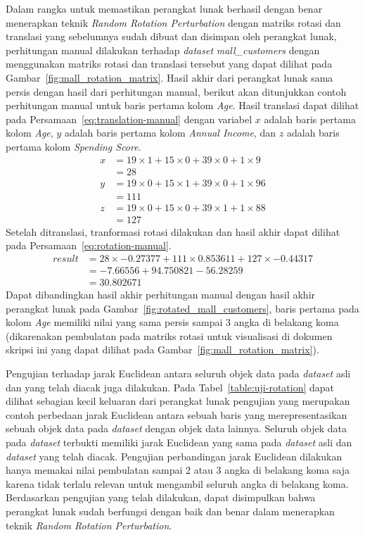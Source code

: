 Dalam rangka untuk memastikan perangkat lunak berhasil dengan benar menerapkan teknik \textit{Random Rotation Perturbation} dengan matriks rotasi dan translasi yang sebelumnya sudah dibuat dan disimpan oleh perangkat lunak, perhitungan manual dilakukan terhadap \textit{dataset} \textit{mall\_customers} dengan menggunakan matriks rotasi dan translasi tersebut yang dapat dilihat pada Gambar~\ref{fig:mall_rotation_matrix}. Hasil akhir dari perangkat lunak sama persis dengan hasil dari perhitungan manual, berikut akan ditunjukkan contoh perhitungan manual untuk baris pertama kolom \textit{Age}. Hasil translasi dapat dilihat pada Persamaan~\ref{eq:translation-manual} dengan variabel \(x\) adalah baris pertama kolom \textit{Age}, \(y\) adalah baris pertama kolom \textit{Annual Income}, dan \(z\) adalah baris pertama kolom \textit{Spending Score}. 
\begin{align}
	x &= 19\times1+15\times0+39\times0+1\times9 \label{eq:translation-manual}\\
	&= 28 \nonumber\\
	y &= 19\times0+15\times1+39\times0+1\times96 \nonumber\\
	&= 111 \nonumber\\
	z &= 19\times0+15\times0+39\times1+1\times88 \nonumber\\
	&= 127 \nonumber
\end{align}
Setelah ditranslasi, tranformasi rotasi dilakukan dan hasil akhir dapat dilihat pada Persamaan~\ref{eq:rotation-manual}. 
\begin{align}
	result &= 28\times-0.27377 + 111\times0.853611 + 127\times-0.44317 \label{eq:rotation-manual}\\
	&= -7.66556 + 94.750821 - 56.28259 \nonumber \\
	&= 30.802671 \nonumber
\end{align}
Dapat dibandingkan hasil akhir perhitungan manual dengan hasil akhir perangkat lunak pada Gambar~\ref{fig:rotated_mall_customers}, baris pertama pada kolom \textit{Age} memiliki nilai yang sama persis sampai 3 angka di belakang koma (dikarenakan pembulatan pada matriks rotasi untuk visualisasi di dokumen skripsi ini yang dapat dilihat pada Gambar~\ref{fig:mall_rotation_matrix}).

Pengujian terhadap jarak Euclidean antara seluruh objek data pada \textit{dataset} asli dan yang telah diacak juga dilakukan. Pada Tabel~\ref{table:uji-rotation} dapat dilihat sebagian kecil keluaran dari perangkat lunak pengujian yang merupakan contoh perbedaan jarak Euclidean antara sebuah baris yang merepresentasikan sebuah objek data pada \textit{dataset} dengan objek data lainnya. Seluruh objek data pada \textit{dataset} terbukti memiliki jarak Euclidean yang sama pada \textit{dataset} asli dan \textit{dataset} yang telah diacak. Pengujian perbandingan jarak Euclidean dilakukan hanya memakai nilai pembulatan sampai 2 atau 3 angka di belakang koma saja karena tidak terlalu relevan untuk mengambil seluruh angka di belakang koma. Berdasarkan pengujian yang telah dilakukan, dapat disimpulkan bahwa perangkat lunak sudah berfungsi dengan baik dan benar dalam menerapkan teknik \textit{Random Rotation Perturbation}.

